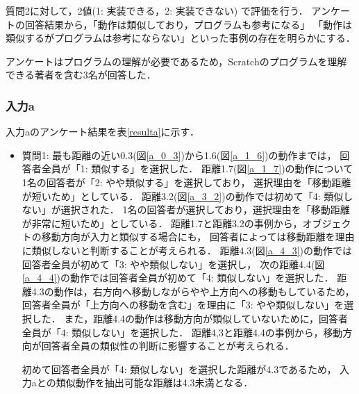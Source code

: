 \documentclass[11pt]{jreport}
\begin{document}
質問2に対して，2値(1: 実装できる，2: 実装できない) で評価を行う．
アンケートの回答結果から，「動作は類似しており，プログラムも参考になる」
「動作は類似するがプログラムは参考にならない」といった事例の存在を明らかにする．

アンケートはプログラムの理解が必要であるため，Scratchのプログラムを理解できる著者を含む3名が回答した．

\subsubsection{入力a}
入力aのアンケート結果を表\ref{resulta}に示す．

\begin{itemize}
    \item 質問1: 最も距離の近い0.3(図\ref{a_0_3})から1.6(図\ref{a_1_6})の動作までは，
    回答者全員が「1: 類似する」を選択した．
    距離1.7(図\ref{a_1_7})の動作について1名の回答者が「2: やや類似する」を選択しており，
    選択理由を「移動距離が短いため」としている．
    距離3.2(図\ref{a_3_2})の動作では初めて「4: 類似しない」が選択された．
    1名の回答者が選択しており，選択理由を「移動距離が非常に短いため」としている．
    距離1.7と距離3.2の事例から，オブジェクトの移動方向が入力と類似する場合にも，
    回答者によっては移動距離を理由に類似しないと判断することが考えられる．
    距離4.3(図\ref{a_4_3})の動作では回答者全員が初めて「3: やや類似しない」を選択し，
    次の距離4.4(図\ref{a_4_4})の動作では回答者全員が初めて「4: 類似しない」を選択した．
    距離4.3の動作は，右方向へ移動しながらやや上方向への移動もしているため，
    回答者全員が「上方向への移動を含む」を理由に「3: やや類似しない」を選択した．
    また，距離4.4の動作は移動方向が類似していないために，回答者全員が「4: 類似しない」を選択した．
    距離4,3と距離4.4の事例から，移動方向が回答者全員の類似性の判断に影響することが考えられる．
    
    初めて回答者全員が「4: 類似しない」を選択した距離が4.3であるため，
    入力aとの類似動作を抽出可能な距離は4.3未満となる．
    

\end{itemize}
\end{document}
